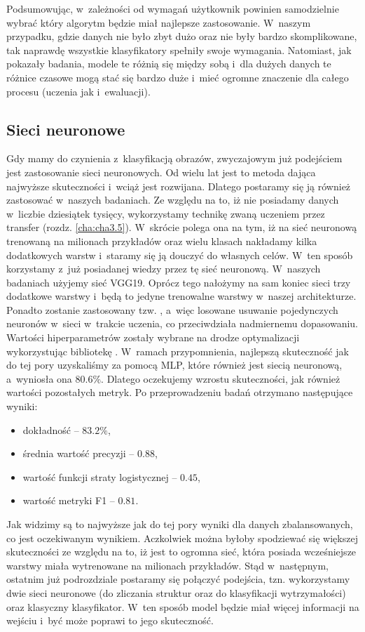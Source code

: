 Podsumowując, w~zależności od wymagań użytkownik powinien samodzielnie wybrać który algorytm będzie miał najlepsze zastosowanie. W~naszym przypadku, gdzie danych nie było zbyt dużo oraz nie były bardzo skomplikowane, tak naprawdę wszystkie klasyfikatory spełniły swoje wymagania. Natomiast, jak pokazały badania, modele te różnią się między sobą i~dla dużych danych te różnice czasowe mogą stać się bardzo duże i~mieć ogromne znaczenie dla całego procesu (uczenia jak i~ewaluacji).

\subsection{Sieci neuronowe}
\label{binary.ann.with.structures}

Gdy mamy do czynienia z~klasyfikacją obrazów, zwyczajowym już podejściem jest zastosowanie sieci neuronowych. Od wielu lat jest to metoda dająca najwyższe skuteczności i~wciąż jest rozwijana. Dlatego postaramy się ją również zastosować w~naszych badaniach. Ze względu na to, iż nie posiadamy danych w~liczbie dziesiątek tysięcy, wykorzystamy technikę zwaną uczeniem przez transfer (rozdz. \ref{cha:cha3.5}). W~skrócie polega ona na tym, iż na sieć neuronową trenowaną na milionach przykładów oraz wielu klasach nakładamy kilka dodatkowych warstw i~staramy się ją douczyć do własnych celów. W~ten sposób korzystamy z~już posiadanej wiedzy przez tę sieć neuronową. W~naszych badaniach użyjemy sieć VGG19. Oprócz tego nałożymy na sam koniec sieci trzy dodatkowe warstwy i~będą to jedyne trenowalne warstwy w~naszej architekturze. Ponadto zostanie zastosowany tzw. , a~więc losowane usuwanie pojedynczych neuronów w~sieci w~trakcie uczenia, co przeciwdziała nadmiernemu dopasowaniu. Wartości hiperparametrów zostały wybrane na drodze optymalizacji wykorzystując bibliotekę . W~ramach przypomnienia, najlepszą skuteczność jak do tej pory uzyskaliśmy za pomocą MLP, które również jest siecią neuronową, a~wyniosła ona $80.6\%$. Dlatego oczekujemy wzrostu skuteczności, jak również wartości pozostałych metryk. 
Po przeprowadzeniu badań otrzymano następujące wyniki:
\begin{itemize}
	\item dokładność – $83.2\%$,
	\item średnia wartość precyzji – $0.88$,
	\item wartość funkcji straty logistycznej – $0.45$,
	\item wartość metryki F1 – $0.81$.
\end{itemize}
Jak widzimy są to najwyższe jak do tej pory wyniki dla danych zbalansowanych, co jest oczekiwanym wynikiem. Aczkolwiek można byłoby spodziewać się większej skuteczności ze względu na to, iż jest to ogromna sieć, która posiada wcześniejsze warstwy miała wytrenowane na milionach przykładów. Stąd w~następnym, ostatnim już podrozdziale postaramy się połączyć podejścia, tzn. wykorzystamy dwie sieci neuronowe (do zliczania struktur oraz do klasyfikacji wytrzymałości) oraz klasyczny klasyfikator. W~ten sposób model będzie miał więcej informacji na wejściu i~być może poprawi to jego skuteczność. 

